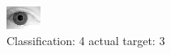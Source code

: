 \begin{figure}[h!]
\begin{center}
\includegraphics[width=0.60\columnwidth]{figures/ID2142_class_4_target_3.png}
\end{center}
\caption{ Classification: 4 actual target: 3}
\label{fig:ID2142_class_4_target_3}
\end{figure}
